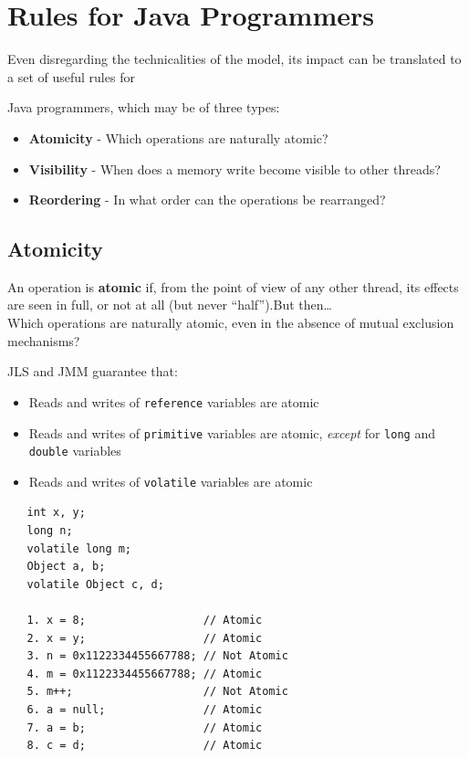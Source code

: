 \section{Rules for Java Programmers}
Even disregarding the technicalities of the model, its
impact can be translated to a set of useful rules for
{Java programmers, which may be of three types:\ns
\begin{itemize}
	\item \textbf{Atomicity} - Which operations are naturally atomic?
	\item \textbf{Visibility} - When does a memory write become
visible to other threads?
	\item \textbf{Reordering} - In what order can the operations be
rearranged?
\end{itemize}}

\subsection{Atomicity}
An operation is \textbf{atomic} if, from the point of view of any other thread, its effects are seen in full, or not at all (but never ``half'').But then\dots\\
Which operations are naturally atomic, even in the absence of mutual
exclusion mechanisms?\\
{JLS and JMM guarantee that:\ns
\begin{itemize}
   \item Reads and writes of \texttt{reference} variables are atomic
   \item Reads and writes of \texttt{primitive} variables are atomic, \textit{except} for \texttt{long} and \texttt{double} variables
   \item Reads and writes of \texttt{volatile} variables are atomic
\end{itemize}}

\begin{lstlisting}
   int x, y;
   long n;
   volatile long m;
   Object a, b;
   volatile Object c, d;
   
   1. x = 8;                  // Atomic
   2. x = y;                  // Atomic
   3. n = 0x1122334455667788; // Not Atomic
   4. m = 0x1122334455667788; // Atomic
   5. m++;                    // Not Atomic
   6. a = null;               // Atomic
   7. a = b;                  // Atomic
   8. c = d;                  // Atomic
\end{lstlisting}


